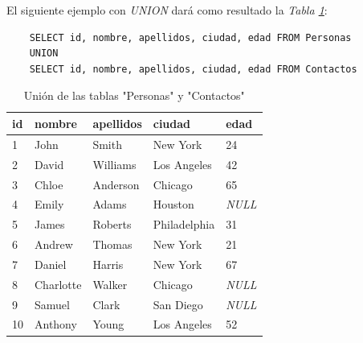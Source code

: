 El siguiente ejemplo con \textit{UNION} dará como resultado la \textit{Tabla \ref{tab: 35}}:
\begin{lstlisting}
    SELECT id, nombre, apellidos, ciudad, edad FROM Personas
    UNION
    SELECT id, nombre, apellidos, ciudad, edad FROM Contactos
\end{lstlisting}
\begin{table}[H]
    \centering
    \caption{Unión de las tablas "Personas" y "Contactos"}
    \label{tab: 35}
    \begin{tabular}{|l|l|l|l|l|}
        \hline
        \textbf{id} & \textbf{nombre} & \textbf{apellidos} & \textbf{ciudad} & \textbf{edad} \\
        \hline
        1 & John        & Smith     & New York      & 24 \\
        \hline
        2 & David       & Williams  & Los Angeles   & 42 \\
        \hline
        3 & Chloe       & Anderson  & Chicago       & 65 \\
        \hline
        4 & Emily       & Adams     & Houston       & \textit{NULL} \\
        \hline
        5 & James       & Roberts   & Philadelphia  & 31 \\
        \hline
        6 & Andrew      & Thomas    & New York      & 21 \\
        \hline
        7 & Daniel      & Harris    & New York      & 67 \\
        \hline
        8 & Charlotte   & Walker    & Chicago       & \textit{NULL} \\
        \hline
        9 & Samuel      & Clark     & San Diego     & \textit{NULL} \\
        \hline
        10 & Anthony    & Young     & Los Angeles   & 52 \\
        \hline
    \end{tabular}
\end{table}

